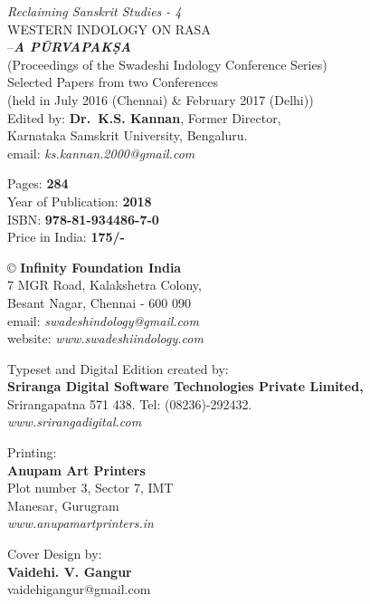 \thispagestyle{empty}

 \textit{Reclaiming Sanskrit Studies - 4}\\
 WESTERN INDOLOGY ON RASA\\–\textbf{\textit{A PŪRVAPAKṢA}}\\ 
 (Proceedings of the Swadeshi Indology Conference Series)\\
 Selected Papers from two Conferences\\
 (held in July 2016 (Chennai) \& February 2017 (Delhi))\\
 Edited by: \textbf{Dr.\ K.S. Kannan}, Former Director,\\ 
 Karnataka Samskrit University, Bengaluru.\\
 email: \textit{ks.kannan.2000@gmail.com}

 Pages: \textbf{284}\\
 Year of Publication: \textbf{2018}\\
 ISBN: \textbf{978-81-934486-7-0}\\
 Price in India: \textbf{175/-}

 © \textbf{Infinity Foundation India}\\
 7 MGR Road, Kalakshetra Colony,\\
 Besant Nagar, Chennai - 600 090\\
 email: \textit{swadeshindology@gmail.com}\\
 website: \textit{www.swadeshiindology.com}

 Typeset and Digital Edition created by:\\\textbf{Sriranga Digital Software Technologies Private Limited,}\\
 Srirangapatna 571 438. Tel: (08236)-292432.\\\textit{www.srirangadigital.com}

 Printing:\\\textbf{Anupam Art Printers}\\
 Plot number 3, Sector 7, IMT\\
 Manesar, Gurugram\\\textit{www.anupamartprinters.in}

 Cover Design by:\\\textbf{Vaidehi. V. Gangur}\\
 vaidehigangur@gmail.com

